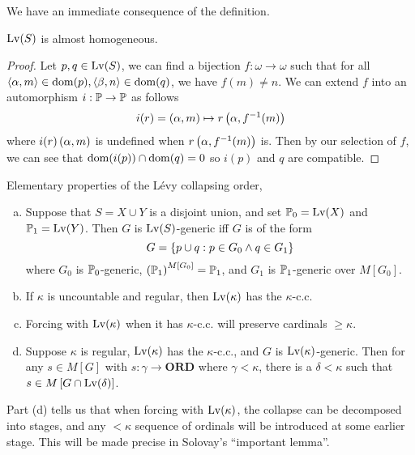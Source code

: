 We have an immediate consequence of the definition.
\begin{proposition}
    \(\Lv(S)\) is almost homogeneous.
\end{proposition}
\begin{proof}
    Let \(p,q\in\Lv(S)\), we can find a bijection \(f:\omega\to\omega\) such that
    for all \(\Angle{\alpha,m}\in\dom(p), \Angle{\beta,n}\in\dom(q)\), we have \(f(m) \ne n\).
    We can extend \(f\) into an automorphism \(i:\P\to\P\) as follows
    \[ i(r) = \paren{\alpha,m}\mapsto r\paren{\alpha, f^{-1}(m)} \]
    where \(i(r)\paren{\alpha,m}\) is undefined when \(r\paren{\alpha,f^{-1}(m)}\) is.
    Then by our selection of \(f\), we can see that \(\dom(i(p)) \cap\dom(q) = 0\) so \(i(p)\) and \(q\) are compatible.
\end{proof}

\begin{lemma} \label{lemma:levy_elementary}
    Elementary properties of the Lévy collapsing order,
    \begin{enumerate}[(a)]
        \item Suppose that \(S = X\cup Y\) is a disjoint union,
            and set \(\P_0 = \Lv(X)\) and \(\P_1 = \Lv(Y)\).
            Then \(G\) is \(\Lv(S)\)-generic iff \(G\) is of the form
            \[G = \set{p\cup q: p\in G_0\land q\in G_1 }\]
            where \(G_0\) is \(\P_0\)-generic, \(\paren{\P_1}^{M[G_0]} = \P_1\),
            and \(G_1\) is \(\P_1\)-generic over \(M[G_0]\).
        \item If \(\kappa\) is uncountable and regular, %
            then \(\Lv(\kappa)\) has the \(\kappa\)-c.c.
        \item Forcing with \(\Lv(\kappa)\) when it has \(\kappa\)-c.c. will preserve cardinals \(\geq \kappa\).
        \item Suppose \(\kappa\) is regular, \(\Lv(\kappa)\) has the \(\kappa\)-c.c., and
            \(G\) is \(\Lv(\kappa)\)-generic.
            Then for any \(s\in M[G]\) with \(s:\gamma \to \mathbf{ORD}\) where \(\gamma < \kappa\),
            there is a \(\delta<\kappa\) such that \(s\in M\sq{G\cap\Lv(\delta)}\).
    \end{enumerate}
\end{lemma}

\begin{remark}

    Part (d) tells us that when forcing with \(\Lv(\kappa)\),
    the collapse can be decomposed into stages, and
    any \(<\kappa\) sequence of ordinals will be introduced at some earlier stage.
    This will be made precise in Solovay's ``important lemma''.
\end{remark}


